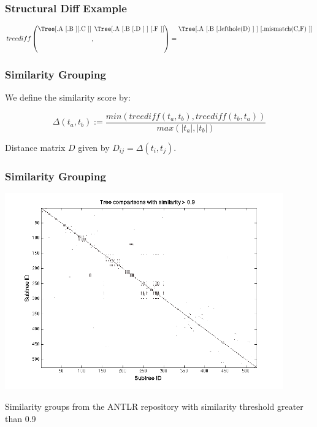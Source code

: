 \documentclass[ignorenonframetext,]{beamer}
\begin{document}
\begin{frame}\frametitle{Structural Diff Example}

\[
treediff\left(\raisebox{1.5em}{\Tree[.A [.B ] [.C ]]},\raisebox{1.5em}{\Tree[.A [.B [.D ] ] [.F ]]}\right) = \raisebox{1.5em}{\Tree[.A [.B [.lefthole(D) ] ] [.mismatch(C,F) ]]}
\]

\end{frame}

\begin{frame}\frametitle{Similarity Grouping}

We define the similarity score by:

\[\Delta(t_a, t_b) := \frac{min(treediff(t_a, t_b),treediff(t_b, t_a))}{max(|t_a|,|t_b|)}\]

Distance matrix $D$ given by $D_{ij} = \Delta(t_i, t_j)$.

\end{frame}

\begin{frame}\frametitle{Similarity Grouping}

\begin{center}
\includegraphics[width=0.9\textwidth]{figures/distmatrix-0-9.png}

Similarity groups from the ANTLR repository with similarity threshold greater than 0.9
\end{center}

\end{frame}
\end{document}
